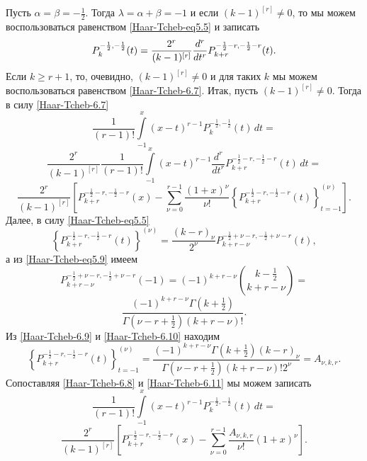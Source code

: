 Пусть $\alpha=\beta=-\frac{1}{2}$. Тогда $\lambda=\alpha+\beta=-1$ и если $(k-1)^{[r]}\neq0$, то мы можем воспользоваться равенством \eqref{Haar-Tcheb-eq5.5} и записать
\begin{equation}\label{Haar-Tcheb-6.7}
P^{-\frac{1}{2},-\frac{1}{2}}_k(t)={2^r \over (k-1 )^{[r]}}\frac{d^r}{dt^r}P_{k+r}^{-\frac{1}{2}-r,-\frac{1}{2}-r}(t).
\end{equation}
 Если  $k\ge r+1$, то, очевидно, $(k-1)^{[r]}\neq0$ и для таких $k$ мы
можем  воспользоваться равенством \eqref{Haar-Tcheb-6.7}. Итак, пусть $(k-1)^{[r]}\neq0$. Тогда в силу  \eqref{Haar-Tcheb-6.7}
$$
\frac{1}{(r-1)!}\int\limits^x_{-1}(x-t)^{r-1}P_k^{-\frac{1}{2},-\frac{1}{2}}(t)\,dt=
$$
$$
\frac{2^r}{(k-1)^{[r]}}\frac{1}{(r-1)!}\int\limits^x_{-1}(x-t)^{r-1}
\frac{d^r}{dt^r}P_{k+r}^{-\frac{1}{2}-r,-\frac{1}{2}-r}(t)\,dt=
$$
\begin{equation}\label{Haar-Tcheb-6.8}
\frac{2^r}{(k-1)^{[r]}}\left[P_{k+r}^{-\frac{1}{2}-r,-\frac{1}{2}-r}(x)-\sum^{r-1}_{\nu=0}
\frac{(1+x)^\nu}{\nu!}\left\{P_{k+r}^{-\frac{1}{2}-r,-\frac{1}{2}-r}(t)
\right\}_{t=-1}^{(\nu)}\right].
\end{equation}
 Далее, в силу \eqref{Haar-Tcheb-eq5.5}
 \begin{equation}\label{Haar-Tcheb-6.9}
\left\{P_{k+r}^{-\frac{1}{2}-r,-\frac{1}{2}-r}(t)\right\}^{(\nu)}=
\frac{(k-r)_\nu}{2^\nu}P_{k+r-\nu}^{-\frac{1}{2}+\nu-r,-\frac{1}{2}+\nu-r}(t),
\end{equation}
а из \eqref{Haar-Tcheb-eq5.9} имеем
$$P_{k+r-\nu}^{-\frac{1}{2}+\nu-r,-\frac{1}{2}+\nu-r}(-1)=(-1)^{k+r-\nu}{k-\frac{1}{2}\choose k+r-\nu}=$$
\begin{equation}\label{Haar-Tcheb-6.10}
\frac{(-1)^{k+r-\nu}\Gamma(k+\frac{1}{2})}{\Gamma(\nu-r+\frac{1}{2})(k+r-\nu)!}.
\end{equation}
Из \eqref{Haar-Tcheb-6.9}  и \eqref{Haar-Tcheb-6.10} находим
\begin{equation}\label{Haar-Tcheb-6.11}
\left\{P_{k+r}^{-\frac{1}{2}-r,-\frac{1}{2}-r}(t)\right\}_{t=-1}^{(\nu)}=
\frac{(-1)^{k+r-\nu}\Gamma(k+\frac{1}{2})(k-r)_{\nu}}
{\Gamma(\nu-r+\frac{1}{2})(k+r-\nu)!2^\nu}=A_{\nu,k,r}.
\end{equation}
Сопоставляя \eqref{Haar-Tcheb-6.8} и \eqref{Haar-Tcheb-6.11} мы можем записать
$$\frac{1}{(r-1)!}\int\limits^x_{-1}(x-t)^{r-1}P_k^{-\frac{1}{2},-\frac{1}{2}}(t)\,dt=$$
\begin{equation}\label{Haar-Tcheb-6.12}
\frac{2^r}{(k-1)^{[r]}}\left[P_{k+r}^{-\frac{1}{2}-r,-\frac{1}{2}-r}(x)-\sum^{r-1}_{\nu=0}
\frac{A_{\nu,k,r}}{\nu!}(1+x)^{\nu}\right].
\end{equation}



